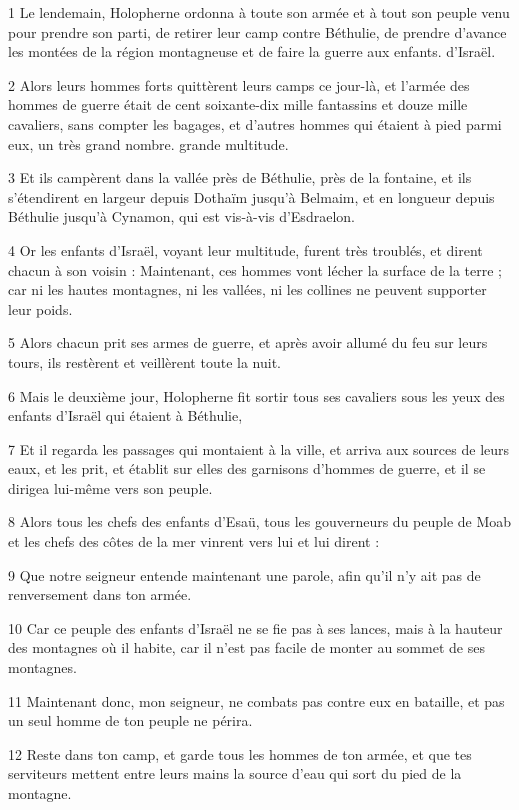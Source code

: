 \par 1 Le lendemain, Holopherne ordonna à toute son armée et à tout son peuple venu pour prendre son parti, de retirer leur camp contre Béthulie, de prendre d'avance les montées de la région montagneuse et de faire la guerre aux enfants. d'Israël.
\par 2 Alors leurs hommes forts quittèrent leurs camps ce jour-là, et l'armée des hommes de guerre était de cent soixante-dix mille fantassins et douze mille cavaliers, sans compter les bagages, et d'autres hommes qui étaient à pied parmi eux, un très grand nombre. grande multitude.
\par 3 Et ils campèrent dans la vallée près de Béthulie, près de la fontaine, et ils s'étendirent en largeur depuis Dothaïm jusqu'à Belmaim, et en longueur depuis Béthulie jusqu'à Cynamon, qui est vis-à-vis d'Esdraelon.
\par 4 Or les enfants d'Israël, voyant leur multitude, furent très troublés, et dirent chacun à son voisin : Maintenant, ces hommes vont lécher la surface de la terre ; car ni les hautes montagnes, ni les vallées, ni les collines ne peuvent supporter leur poids.
\par 5 Alors chacun prit ses armes de guerre, et après avoir allumé du feu sur leurs tours, ils restèrent et veillèrent toute la nuit.
\par 6 Mais le deuxième jour, Holopherne fit sortir tous ses cavaliers sous les yeux des enfants d'Israël qui étaient à Béthulie,
\par 7 Et il regarda les passages qui montaient à la ville, et arriva aux sources de leurs eaux, et les prit, et établit sur elles des garnisons d'hommes de guerre, et il se dirigea lui-même vers son peuple.
\par 8 Alors tous les chefs des enfants d'Esaü, tous les gouverneurs du peuple de Moab et les chefs des côtes de la mer vinrent vers lui et lui dirent :
\par 9 Que notre seigneur entende maintenant une parole, afin qu'il n'y ait pas de renversement dans ton armée.
\par 10 Car ce peuple des enfants d'Israël ne se fie pas à ses lances, mais à la hauteur des montagnes où il habite, car il n'est pas facile de monter au sommet de ses montagnes.
\par 11 Maintenant donc, mon seigneur, ne combats pas contre eux en bataille, et pas un seul homme de ton peuple ne périra.
\par 12 Reste dans ton camp, et garde tous les hommes de ton armée, et que tes serviteurs mettent entre leurs mains la source d'eau qui sort du pied de la montagne.
